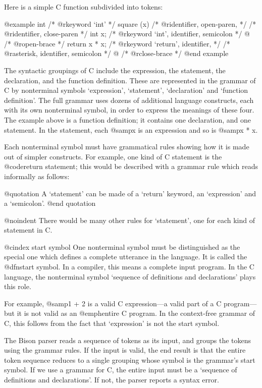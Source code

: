 Here is a simple C function subdivided into tokens:

@example
int             /* @r{keyword `int'} */
square (x)      /* @r{identifier, open-paren,} */
                /* @r{identifier, close-paren} */
     int x;     /* @r{keyword `int', identifier, semicolon} */
@{               /* @r{open-brace} */
  return x * x; /* @r{keyword `return', identifier,} */
                /* @r{asterisk, identifier, semicolon} */
@}               /* @r{close-brace} */
@end example

The syntactic groupings of C include the expression, the statement, the
declaration, and the function definition.  These are represented in the
grammar of C by nonterminal symbols `expression', `statement',
`declaration' and `function definition'.  The full grammar uses dozens of
additional language constructs, each with its own nonterminal symbol, in
order to express the meanings of these four.  The example above is a
function definition; it contains one declaration, and one statement.  In
the statement, each @samp{x} is an expression and so is @samp{x * x}.

Each nonterminal symbol must have grammatical rules showing how it is made
out of simpler constructs.  For example, one kind of C statement is the
@code{return} statement; this would be described with a grammar rule which
reads informally as follows:

@quotation
A `statement' can be made of a `return' keyword, an `expression' and a
`semicolon'.
@end quotation

@noindent
There would be many other rules for `statement', one for each kind of
statement in C.

@cindex start symbol
One nonterminal symbol must be distinguished as the special one which
defines a complete utterance in the language.  It is called the @dfn{start
symbol}.  In a compiler, this means a complete input program.  In the C
language, the nonterminal symbol `sequence of definitions and declarations'
plays this role.

For example, @samp{1 + 2} is a valid C expression---a valid part of a C
program---but it is not valid as an @emph{entire} C program.  In the
context-free grammar of C, this follows from the fact that `expression' is
not the start symbol.

The Bison parser reads a sequence of tokens as its input, and groups the
tokens using the grammar rules.  If the input is valid, the end result is
that the entire token sequence reduces to a single grouping whose symbol is
the grammar's start symbol.  If we use a grammar for C, the entire input
must be a `sequence of definitions and declarations'.  If not, the parser
reports a syntax error.

